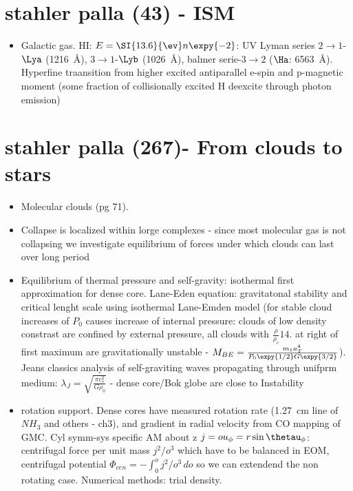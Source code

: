 \chapter{stahler palla (43) - ISM }

\begin{itemize}
\item Galactic gas. HI: $E=\SI{13.6}{\ev}n\expy{-2}$: UV Lyman series $2\to1$-$\Lya$ (\SI{1216}{\angstrom}), $3\to1$-$\Lyb$ (\SI{1026}{\angstrom}), balmer serie-$3\to2$ ($\Ha$: \SI{6563}{\angstrom}). Hyperfine traansition from higher excited antiparallel e-spin and p-magnetic moment (some fraction of collisionally excited H deexcite through photon emission)
\end{itemize}

\chapter{stahler palla (267)- From clouds to stars}

\begin{itemize}
\item Molecular clouds (pg 71). 
\item Collapse is localized within lorge complexes - since most molecular gas is not collapsing we investigate equilibrium of forces under which clouds can last over long period
\item Equilibrium of thermal pressure and self-gravity: isothermal first approximation for dense core. Lane-Eden equation: gravitatonal stability and critical lenght scale using isothermal Lane-Emden model (for stable cloud increases of $P_0$ causes increase of internal pressure: clouds of low density constrast are confined by external pressure, all clouds with $\frac{\rho}{\rho_c}14.$ at right of first maximum are gravitationally unstable - $M_{BE}=\frac{m_1a_T^4}{P_0\expy{1/2}G\expy{3/2}}$). Jeans classics analysis of self-graviting waves propagating through unifprm medium: $\lambda_J=\sqrt{\frac{\pi c_s^2}{G\rho_0}}$ - dense core/Bok globe are close to Instability
\item rotation support. Dense cores have measured rotation rate (\SI{1.27}{\cm} line of $NH_3$ and others - ch3), and gradient in radial velocity from CO mapping of GMC. Cyl symm-sys specific AM about z $j=ou_{\phi}=r\sin\thetau_{\phi}$: centrifugal force per unit mass $j^2/o^3$ which have to be balanced in EOM, centrifugal potential $\Phi_{cen}=-\int_0^oj^2/o^3\,do$ so we can extendend the non rotating case. Numerical methods: trial density. 
\end{itemize}